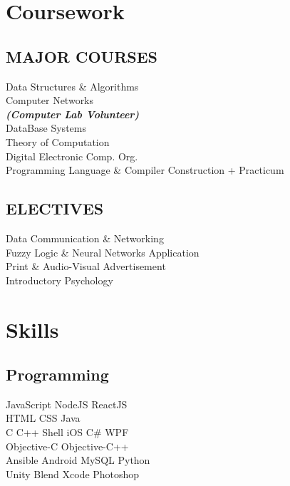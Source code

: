 \documentclass[]{deedy-resume-openfont}
\begin{document}
\begin{minipage}[t]{0.33\textwidth}

\section{Coursework}


\subsection{MAJOR COURSES}
Data Structures \& Algorithms \\
Computer Networks \\
{\footnotesize \textit{\textbf{(Computer Lab Volunteer) }}} \\
DataBase Systems \\
Theory of Computation \\
Digital Electronic Comp. Org. \\
Programming Language \& Compiler Construction + Practicum\\
\sectionsep

\subsection{ELECTIVES}
Data Communication \& Networking \\
Fuzzy Logic \& Neural Networks Application \\
Print \& Audio-Visual Advertisement \\
Introductory Psychology \\
\sectionsep


\section{Skills}
\subsection{Programming}
JavaScript \textbullet{} NodeJS \textbullet{} ReactJS\\ 
 \textbullet{} HTML \textbullet{} CSS \textbullet{} Java  \\ 
C \textbullet{} C++ \textbullet{} Shell \textbullet{} iOS \textbullet{} C\#\textbullet{} WPF\\
Objective-C \textbullet{} Objective-C++ \\
Ansible  \textbullet{} Android \textbullet{} MySQL\textbullet{} Python\\
Unity \textbullet{} Blend \textbullet{} Xcode \textbullet{} Photoshop
\sectionsep

%
%

\end{minipage} 
\end{document}
